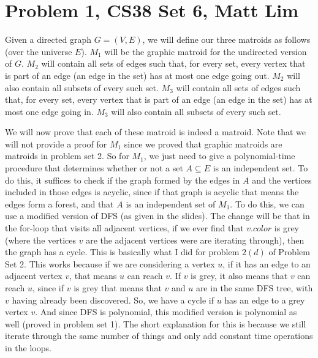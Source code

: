 \documentclass{article}
\begin{document}
\section*{Problem 1, CS38 Set 6, Matt Lim}
Given a directed graph $G = (V,E)$, we will define our three matroids as follows
(over the universe $E$). $M_1$
will be the graphic matroid for the undirected version of $G$.
$M_2$ will contain all sets of edges such
that, for every set, every vertex that is part of an edge (an edge in the set)
has at most one edge going out. $M_2$ will also contain all subsets of every such set. $M_3$
will contain all sets of edges such that, for every set, every vertex that is part of an edge
(an edge in the set) has at most one edge going in. $M_3$ will also contain all
subsets of every such set.

We will now prove that each of these matroid is indeed a matroid. Note that we
will not provide a proof for $M_1$ since we proved that graphic matroids are
matroids in problem set 2. So for $M_1$, we just need to give a polynomial-time
procedure that determines whether or not a set $A \subseteq E$ is an independent
set. To do this, it suffices to check if the graph formed by the edges
in $A$ and the vertices included in those edges is acyclic, since if that graph
is acyclic that means the
edges form a forest, and that $A$ is an independent set of $M_1$.
To do this, we can use a modified version of DFS (as given in the slides).
The change will be that in the for-loop that visits all adjacent vertices, if we
ever find that
$v.color$ is grey (where the vertices $v$ are the adjacent vertices were are
iterating through), then the graph has a cycle. This is basically what I did for
problem $2(d)$ of Problem Set 2. This works because if we are considering a
vertex $u$, if it has an edge to an adjacent vertex $v$, that means $u$ can
reach $v$. If $v$ is grey, it also means that $v$ can reach $u$, since if $v$ is
grey that means that $v$ and $u$ are in the same DFS tree, with $v$ having
already been discovered. So, we have a cycle if $u$ has an edge to a grey vertex
$v$. And since DFS is polynomial, this modified version is polynomial as well
(proved in problem set 1). The short explanation for this is because we still
iterate through the same number of things and only add constant time operations
in the loops.
\end{document}
